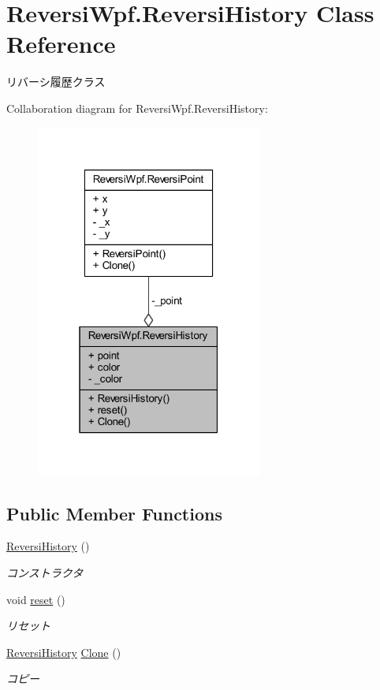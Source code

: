 \hypertarget{class_reversi_wpf_1_1_reversi_history}{}\section{Reversi\+Wpf.\+Reversi\+History Class Reference}
\label{class_reversi_wpf_1_1_reversi_history}


リバーシ履歴クラス  




Collaboration diagram for Reversi\+Wpf.\+Reversi\+History\+:\nopagebreak
\begin{figure}[H]
\begin{center}
\leavevmode
\includegraphics[width=211pt]{class_reversi_wpf_1_1_reversi_history__coll__graph}
\end{center}
\end{figure}
\subsection*{Public Member Functions}
\begin{DoxyCompactItemize}
\item 
\hyperlink{class_reversi_wpf_1_1_reversi_history_a25e64abaf19f7265921c21940c875d31}{Reversi\+History} ()
\begin{DoxyCompactList}\small\item\em コンストラクタ \end{DoxyCompactList}\item 
void \hyperlink{class_reversi_wpf_1_1_reversi_history_a2a57686bf23df7dcfa8ee9cd8cdc7fdb}{reset} ()
\begin{DoxyCompactList}\small\item\em リセット \end{DoxyCompactList}\item 
\hyperlink{class_reversi_wpf_1_1_reversi_history}{Reversi\+History} \hyperlink{class_reversi_wpf_1_1_reversi_history_a3f8fa9ca02b1fdb6068e9ae3ebdc80f8}{Clone} ()
\begin{DoxyCompactList}\small\item\em コピー \end{DoxyCompactList}\end{DoxyCompactItemize}
